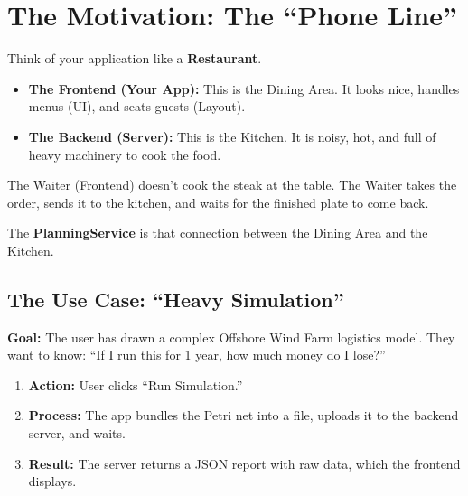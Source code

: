 \documentclass[a4paper,11pt,oneside]{report}
\begin{document}
\section{The Motivation: The ``Phone Line''}

Think of your application like a \textbf{Restaurant}.
\begin{itemize}
    \item \textbf{The Frontend (Your App):} This is the Dining Area. It looks nice, handles menus (UI), and seats guests (Layout).
    \item \textbf{The Backend (Server):} This is the Kitchen. It is noisy, hot, and full of heavy machinery to cook the food.
\end{itemize}

The Waiter (Frontend) doesn't cook the steak at the table. The Waiter takes the order, sends it to the kitchen, and waits for the finished plate to come back.

The \textbf{PlanningService} is that connection between the Dining Area and the Kitchen.

\subsection{The Use Case: ``Heavy Simulation''}

\textbf{Goal:} The user has drawn a complex Offshore Wind Farm logistics model. They want to know: ``If I run this for 1 year, how much money do I lose?''
\begin{enumerate}
    \item \textbf{Action:} User clicks ``Run Simulation.''
    \item \textbf{Process:} The app bundles the Petri net into a file, uploads it to the backend server, and waits.
    \item \textbf{Result:} The server returns a JSON report with raw data, which the frontend displays.
\end{enumerate}
\end{document}
